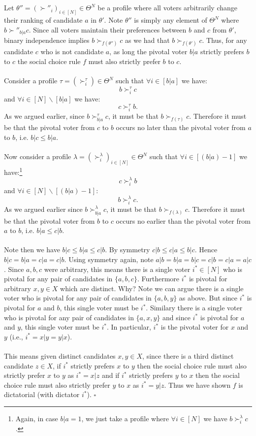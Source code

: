 \documentclass[11pt]{article}
\theoremstyle{definition}
\theoremstyle{plain}
\begin{document}
\\
\\
Let $\theta''=(\succ''_i)_{i \in [N]} \in \Theta^N$ be a profile where all voters arbitrarily change their ranking of candidate $a$ in $\theta'$. Note $\theta''$ is simply any element of $\Theta^N$ where $b \succ''_{b|a} c$. Since all voters maintain their preferences between $b$ and $c$ from $\theta'$, binary  independence implies $b \succ_{f(\theta'')} c$ as we had that $b \succ_{f(\theta')} c$. Thus, for any candidate $c$ who is not candidate $a$, as long the pivotal voter $b|a$ strictly prefers $b$ to $c$ the social choice rule $f$ must also strictly prefer $b$ to $c$.
\\
\\
Consider a profile $\tau=(\succ^\tau_i) \in \Theta^N$ such that $\forall i \in [b|a]$ we have:
$$b \succ^{\tau}_i c$$
and $\forall i \in [N] \backslash[b|a]$ we have:
$$c \succ^{\tau}_i b.$$
As we  argued earlier, since $b \succ^\tau_{b|a} c$, it must be that $b \succ_{f(\tau)} c$. Therefore it must be that the pivotal voter from $c$ to $b$ occurs no later than the pivotal voter from $a$ to $b$, i.e. $b|c \leq b|a$. 
\\
\\
Now consider a profile $\lambda=(\succ^{\lambda}_i)_{i \in [N]} \in \Theta^N$ such that $\forall i \in [(b|a)-1]$ we have:\footnote{Again, in case $b|a=1$,  we just take a profile where $\forall i \in [N]$ we have $b \succ^{\lambda}_i c$.}
$$c \succ_i^{\lambda} b$$
and $\forall i \in [N]\backslash [(b|a)-1]$:
$$b \succ_i^{\lambda} c.$$
As we argued earlier since $b \succ^\lambda_{b|a} c$, it must be that $b \succ_{f(\lambda)} c$. Therefore it must be that the pivotal voter from $b$ to $c$ occurs no earlier than the pivotal voter from $a$ to $b$, i.e. $b|a \leq c|b$.
\\
\\
Note then we have $b|c \leq b|a \leq c|b$. By symmetry $c|b \leq c|a \leq b|c$. Hence $b|c=b|a=c|a=c|b$. Using symmetry again, note $a|b=b|a=b|c=c|b=c|a=a|c$. Since $a,b,c$ were arbitrary, this means there is a single voter $i^* \in [N]$ who is pivotal for any pair of candidates in $\{a,b,c\}$. Furthermore $i^*$ is pivotal for arbitrary $x,y \in X$ which are distinct. Why? Note we can argue there is a single voter who is pivotal for any pair of candidates in $\{a,b,y\}$ as above. But since $i^*$ is pivotal for $a$ and $b$, this single voter must be $i^*$. Similary there is a single voter who is pivotal for any pair of candidates in $\{a,x,y\}$ and since $i^*$ is pivotal for $a$ and $y$, this single voter must be $i^*$. In particular, $i^*$ is the pivotal voter for $x$ and $y$ (i.e., $i^*=x|y=y|x$).
\\
\\
This means given distinct candidates $x,y \in X$, since there is a third distinct candidate $z \in X$, if $i^*$ strictly prefers $x$ to $y$ then the social choice rule must also strictly prefer $x$ to $y$ as $i^*=x|z$ and if $i^*$ strictly prefers $y$ to $x$ then the social choice rule must also strictly prefer $y$ to $x$ as $i^*=y|z$. Thus we have shown $f$ is dictatorial (with dictator $i^*$). $\square$
\end{document}
